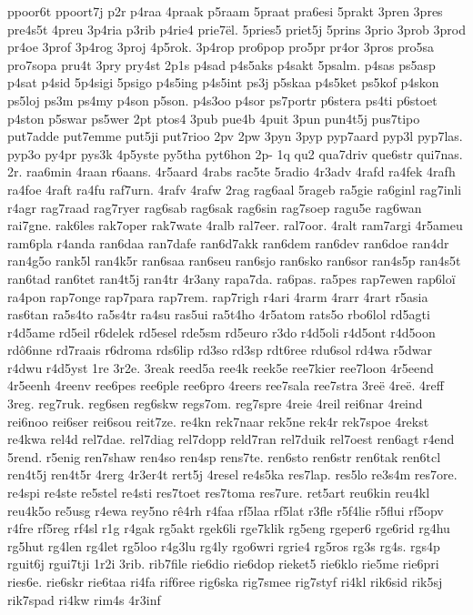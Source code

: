 ppoor6t
ppoort7j
p2r
p4raa
4praak
p5raam
5praat
pra6esi
5prakt
3pren
3pres
pre4s5t
4preu
3p4ria
p3rib
p4rie4
prie7ël.
5pries5
priet5j
5prins
3prio
3prob
3prod
pr4oe
3prof
3p4rog
3proj
4p5rok.
3p4rop
pro6pop
pro5pr
pr4or
3pros
pro5sa
pro7sopa
pru4t
3pry
pry4st
2p1s
p4sad
p4s5aks
p4sakt
5psalm.
p4sas
ps5asp
p4sat
p4sid
5p4sigi
5psigo
p4s5ing
p4s5int
ps3j
p5skaa
p4s5ket
ps5kof
p4skon
ps5loj
ps3m
ps4my
p4son
p5son.
p4s3oo
p4sor
ps7portr
p6stera
ps4ti
p6stoet
p4ston
p5swar
ps5wer
2pt
ptos4
3pub
pue4b
4puit
3pun
pun4t5j
pus7tipo
put7adde
put7emme
put5ji
put7rioo
2pv
2pw
3pyn
3pyp
pyp7aard
pyp3l
pyp7las.
pyp3o
py4pr
pys3k
4p5yste
py5tha
pyt6hon
2p-
1q
qu2
qua7driv
que6str
qui7nas.
2r.
raa6min
4raan
r6aans.
4r5aard
4rabs
rac5te
5radio
4r3adv
4rafd
ra4fek
4rafh
ra4foe
4raft
ra4fu
raf7urn.
4rafv
4rafw
2rag
rag6aal
5rageb
ra5gie
ra6ginl
rag7inli
r4agr
rag7raad
rag7ryer
rag6sab
rag6sak
rag6sin
rag7soep
ragu5e
rag6wan
rai7gne.
rak6les
rak7oper
rak7wate
4ralb
ral7eer.
ral7oor.
4ralt
ram7argi
4r5ameu
ram6pla
r4anda
ran6daa
ran7dafe
ran6d7akk
ran6dem
ran6dev
ran6doe
ran4dr
ran4g5o
rank5l
ran4k5r
ran6saa
ran6seu
ran6sjo
ran6sko
ran6sor
ran4s5p
ran4s5t
ran6tad
ran6tet
ran4t5j
ran4tr
4r3any
rapa7da.
ra6pas.
ra5pes
rap7ewen
rap6loï
ra4pon
rap7onge
rap7para
rap7rem.
rap7righ
r4ari
4rarm
4rarr
4rart
r5asia
ras6tan
ra5s4to
ra5s4tr
ra4su
ras5ui
ra5t4ho
4r5atom
rats5o
rbo6lol
rd5agti
r4d5ame
rd5eil
r6delek
rd5esel
rde5sm
rd5euro
r3do
r4d5oli
r4d5ont
r4d5oon
rdô6nne
rd7raais
r6droma
rds6lip
rd3so
rd3sp
rdt6ree
rdu6sol
rd4wa
r5dwar
r4dwu
r4d5yst
1re
3r2e.
3reak
reed5a
ree4k
reek5e
ree7kier
ree7loon
4r5eend
4r5eenh
4reenv
ree6pes
ree6ple
ree6pro
4reers
ree7sala
ree7stra
3reë
4reë.
4reff
3reg.
reg7ruk.
reg6sen
reg6skw
regs7om.
reg7spre
4reie
4reil
rei6nar
4reind
rei6noo
rei6ser
rei6sou
reit7ze.
re4kn
rek7naar
rek5ne
rek4r
rek7spoe
4rekst
re4kwa
rel4d
rel7dae.
rel7diag
rel7dopp
reld7ran
rel7duik
rel7oest
ren6agt
r4end
5rend.
r5enig
ren7shaw
ren4so
ren4sp
rens7te.
ren6sto
ren6str
ren6tak
ren6tcl
ren4t5j
ren4t5r
4rerg
4r3er4t
rert5j
4resel
re4s5ka
res7lap.
res5lo
re3s4m
res7ore.
re4spi
re4ste
re5stel
re4sti
res7toet
res7toma
res7ure.
ret5art
reu6kin
reu4kl
reu4k5o
re5usg
r4ewa
rey5no
rê4rh
r4faa
rf5laa
rf5lat
r3fle
r5f4lie
r5flui
rf5opv
r4fre
rf5reg
rf4sl
r1g
r4gak
rg5akt
rgek6li
rge7klik
rg5eng
rgeper6
rge6rid
rg4hu
rg5hut
rg4len
rg4let
rg5loo
r4g3lu
rg4ly
rgo6wri
rgrie4
rg5ros
rg3s
rg4s.
rgs4p
rguit6j
rgui7tji
1r2i
3rib.
rib7file
rie6dio
rie6dop
rieket5
rie6klo
rie5me
rie6pri
ries6e.
rie6skr
rie6taa
ri4fa
rif6ree
rig6ska
rig7smee
rig7styf
ri4kl
rik6sid
rik5sj
rik7spad
ri4kw
rim4s
4r3inf
